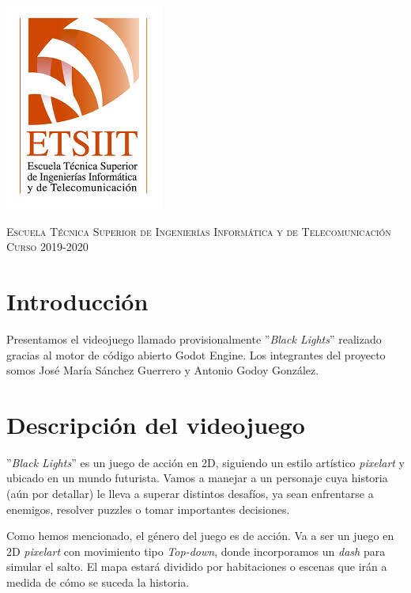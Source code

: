 \documentclass[11pt,a4paper]{article}
\begin{document}
\begin{titlepage}
\begin{minipage}{\textwidth}
\includegraphics[scale=0.3]{img/etsiit.jpeg}

\vspace{0.7cm}
\textsc{Escuela Técnica Superior de Ingenierías Informática y de Telecomunicación}\\
\vspace{1cm}
\textsc{Curso 2019-2020}
\end{minipage}
\end{titlepage}

\thispagestyle{empty}				%

\newpage

\setlength{\parskip}{1em}


\section*{Introducción}

Presentamos el videojuego llamado provisionalmente ''\textit{Black Lights}'' realizado gracias al motor
de código abierto Godot Engine. Los integrantes del proyecto somos José María Sánchez Guerrero y Antonio
Godoy González.

\section*{Descripción del videojuego}

''\textit{Black Lights}'' es un juego de acción en 2D, siguiendo un estilo artístico \textit{pixelart} y
ubicado en un mundo futurista. Vamos a manejar a un personaje cuya historia (aún por detallar) le lleva
a superar distintos desafíos, ya sean enfrentarse a enemigos, resolver puzzles o tomar importantes
decisiones.

Como hemos mencionado, el género del juego es de acción. Va a ser un juego en 2D \textit{pixelart} con
movimiento tipo \textit{Top-down}, donde incorporamos un \textit{dash} para simular el salto. El mapa
estará dividido por habitaciones o escenas que irán a medida de cómo se suceda la historia.
\end{document}
